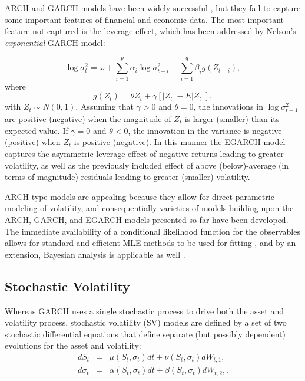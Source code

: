 ARCH and GARCH models have been widely successful \citep*{bollerslev2003measuring}, but they fail to capture some important features of financial and economic data. The most important feature not captured is the leverage effect, which has been addressed by Nelson's \textit{exponential} GARCH \citep*{nelson1991conditional} model: 

 	\[ \log \sigma_t^2 = \omega + \sum_{i=1}^p \alpha_i \log \sigma_{t-i}^2 + \sum_{i=1}^q \beta_i g(Z_{t-i}), \]
where 
	\[ g(Z_t) = \theta Z_t + \gamma[ |Z_t| - E|Z_t| ], \] 
with $Z_t \sim N(0,1)$. Assuming that $\gamma > 0$ and $\theta = 0$, the innovations in $\log \sigma^2_{t+1}$ are positive (negative) when the magnitude of $Z_t$ is larger (smaller) than its expected value. If $\gamma = 0$ and $\theta <0$, the innovation in the variance is negative (positive) when $Z_t$ is positive (negative). In this manner the EGARCH model captures the asymmetric leverage effect of negative returns leading to greater volatility, as well as the previously included effect of above (below)-average (in terms of magnitude) residuals leading to greater (smaller) volatility. 

ARCH-type models are appealing because they allow for direct parametric modeling of volatility, and consequentially varieties of models building upon the ARCH, GARCH, and EGARCH models presented so far have been developed. The immediate availability of a conditional likelihood function for the observables allows for standard and efficient MLE methods to be used for fitting \citep*{baillie1991bivariate}, and by an extension, Bayesian analysis is applicable as well \citep{bauwens1998bayesian, nakatsuma2000bayesian, vrontos2000full}. 


	\subsection{Stochastic Volatility}
	Whereas GARCH uses a single stochastic process to drive both the asset and volatility process, stochastic volatility (SV) models are defined by a set of two stochastic differential equations that define separate (but possibly dependent) evolutions for the asset and volatility:
\begin{eqnarray}
	dS_t &=& \mu(S_t, \sigma_t)dt + \nu(S_t, \sigma_t)dW_{t,1} \label{eq:SV-model-1}, \\
	d\sigma_t &=& \alpha(S_t, \sigma_t)dt + \beta(S_t, \sigma_t)dW_{t,2}, \label{eq:SV-model-2}.
\end{eqnarray}

